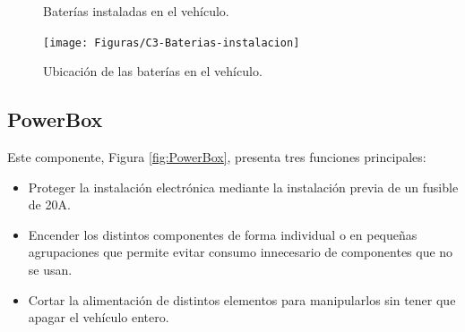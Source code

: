 \begin{figure}[!ht]
\begin{center}
	\caption{Baterías instaladas en el vehículo.}
\end{center}
\end{figure}

\begin{figure}[!ht]
  \centering
    \texttt{[image: Figuras/C3-Baterias-instalacion]}
  \caption{Ubicación de las baterías en el vehículo.}
  \label{fig:baterias-asientos}
\end{figure}

\subsection{PowerBox}
Este componente, Figura \ref{fig:PowerBox}, presenta tres funciones principales:
\begin{itemize}
\item Proteger la instalación electrónica mediante la instalación previa de un fusible de 20A.

\item Encender los distintos componentes de forma individual o en pequeñas agrupaciones que permite evitar consumo innecesario de componentes que no se usan.

\item Cortar la alimentación de distintos elementos para manipularlos sin tener que apagar el vehículo entero.
\end{itemize}


